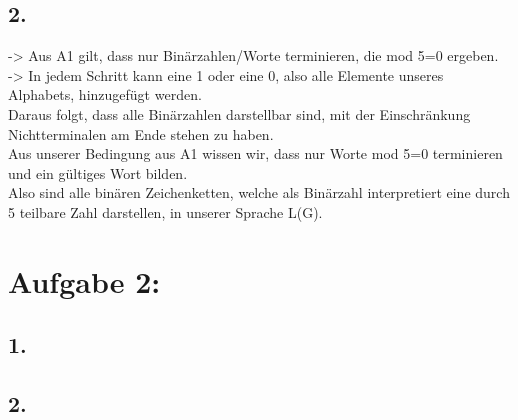 \documentclass[11pt]{article}
\theoremstyle{definition}
\theoremstyle{remark}
\begin{document}
    \subsection*{2.}
    \begin{normalsize}
         -> Aus A1 gilt, dass nur Binärzahlen/Worte terminieren, die mod 5=0 ergeben.\\
         -> In jedem Schritt kann eine 1 oder eine 0, also alle Elemente unseres Alphabets,
            hinzugefügt werden.\\
            Daraus folgt, dass alle Binärzahlen darstellbar sind, mit der Einschränkung Nichtterminalen am Ende stehen zu haben.\\
            Aus unserer Bedingung aus A1 wissen wir, dass nur Worte mod 5=0 terminieren und ein gültiges Wort bilden.\\
            Also sind alle binären Zeichenketten, welche als Binärzahl interpretiert eine durch 5 teilbare Zahl darstellen, in unserer Sprache L(G).
    \end{normalsize}

    \newpage
    \section*{Aufgabe 2:}
    \subsection*{1.}
    \begin{normalsize}

    \end{normalsize}
    \subsection*{2.}
    \begin{normalsize}

    \end{normalsize}
\end{document}
